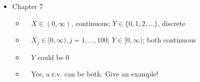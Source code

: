 \documentclass[12pt]{article}
\begin{document}
\begin{itemize}
%
%



\item Chapter 7          \label{ANS_7}
	\begin{itemize}
	\item[\# 2] \ \   $X\in(0,\infty)$, continuous; $Y\in\{0,1,2,\ldots\}$, discrete
	\item[\# 10]\ \  $X_j\in[0,\infty),j=1,\ldots,100$; $Y\in[0,\infty)$; both continuous
	\item[\# 16]\ \  $Y$ could be 0
	\item[\# 18]\ \  Yes, a r.v. can be both. Give an example!
	\end{itemize}


\end{itemize}
\end{document}
